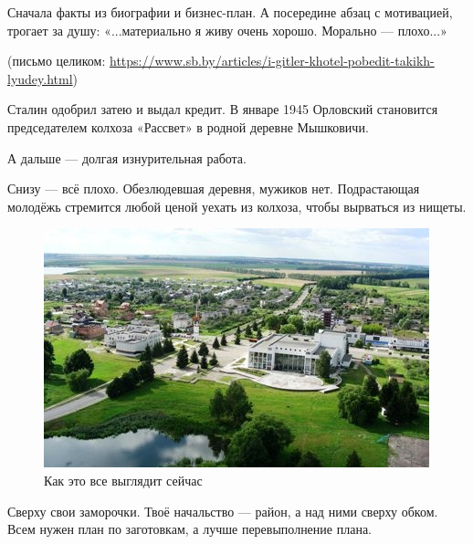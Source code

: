 Сначала факты из биографии и бизнес-план. А посередине абзац с мотивацией, трогает за душу:
«...материально я живу очень хорошо. Морально — плохо...»

(письмо целиком: \url{https://www.sb.by/articles/i-gitler-khotel-pobedit-takikh-lyudey.html})

Сталин одобрил затею и выдал кредит.
В январе 1945 Орловский становится председателем колхоза «Рассвет» в родной деревне Мышковичи.

А дальше — долгая изнурительная работа.

Снизу — всё плохо. Обезлюдевшая деревня, мужиков нет. Подрастающая молодёжь стремится любой ценой уехать из колхоза, чтобы вырваться из нищеты.
\begin{figure}[h!tb] 
	\centering\includegraphics[scale=0.6]{Orlovskiy/3OfP7SDYNgM.jpg}
	\caption{Как это все выглядит сейчас}%
\end{figure}
Сверху свои заморочки. Твоё начальство — район, а над ними сверху обком. Всем нужен план по заготовкам, а лучше перевыполнение плана.

